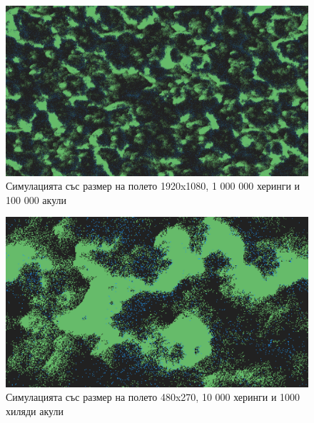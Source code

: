 \documentclass{article}
\begin{document}
\begin{figure}[H]
	\centering
	\includegraphics[width=1\textwidth]{screenshot-big.png}
	\caption{Симулацията със размер на полето 1920x1080, 1 000 000 херинги и 100 000 акули}
	\label{fig:figure2}
\end{figure}

\begin{figure}[H]
	\centering
	\includegraphics[width=1\textwidth]{screenshot-small.png}
	\caption{Симулацията със размер на полето 480x270, 10 000 херинги и 1000 хиляди акули}
	\label{fig:figure3}
\end{figure}

{}

\end{document}
